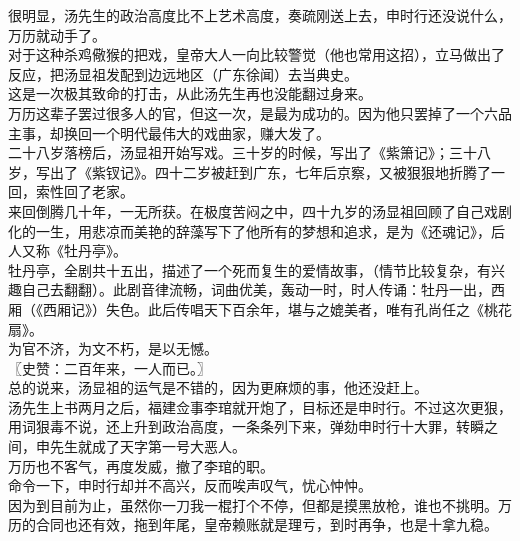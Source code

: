 \begin{multicols}{\theparacolNo}
很明显，汤先生的政治高度比不上艺术高度，奏疏刚送上去，申时行还没说什么，万历就动手了。\\

对于这种杀鸡儆猴的把戏，皇帝大人一向比较警觉（他也常用这招），立马做出了反应，把汤显祖发配到边远地区（广东徐闻）去当典史。\\

这是一次极其致命的打击，从此汤先生再也没能翻过身来。\\

万历这辈子罢过很多人的官，但这一次，是最为成功的。因为他只罢掉了一个六品主事，却换回一个明代最伟大的戏曲家，赚大发了。\\

二十八岁落榜后，汤显祖开始写戏。三十岁的时候，写出了《紫箫记》；三十八岁，写出了《紫钗记》。四十二岁被赶到广东，七年后京察，又被狠狠地折腾了一回，索性回了老家。\\

来回倒腾几十年，一无所获。在极度苦闷之中，四十九岁的汤显祖回顾了自己戏剧化的一生，用悲凉而美艳的辞藻写下了他所有的梦想和追求，是为《还魂记》，后人又称《牡丹亭》。\\

牡丹亭，全剧共十五出，描述了一个死而复生的爱情故事，（情节比较复杂，有兴趣自己去翻翻）。此剧音律流畅，词曲优美，轰动一时，时人传诵：牡丹一出，西厢（《西厢记》）失色。此后传唱天下百余年，堪与之媲美者，唯有孔尚任之《桃花扇》。\\

为官不济，为文不朽，是以无憾。\\

〖史赞：二百年来，一人而已。〗\\

总的说来，汤显祖的运气是不错的，因为更麻烦的事，他还没赶上。\\

汤先生上书两月之后，福建佥事李琯就开炮了，目标还是申时行。不过这次更狠，用词狠毒不说，还上升到政治高度，一条条列下来，弹劾申时行十大罪，转瞬之间，申先生就成了天字第一号大恶人。\\

万历也不客气，再度发威，撤了李琯的职。\\

命令一下，申时行却并不高兴，反而唉声叹气，忧心忡忡。\\

因为到目前为止，虽然你一刀我一棍打个不停，但都是摸黑放枪，谁也不挑明。万历的合同也还有效，拖到年尾，皇帝赖账就是理亏，到时再争，也是十拿九稳。\\


\end{multicols}
